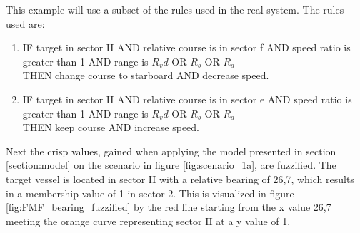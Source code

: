 This example will use a subset of the rules used in the real system.
The rules used are:
\begin{enumerate}[label=\textbf{Rule \arabic*},ref=Rule \arabic*]
    \item \label{rule:1} IF target in sector II AND relative course is in sector f  AND speed ratio is greater than 1  AND range is $R_vd$ OR $R_b$ OR $R_a$ \\THEN change course to starboard  AND  decrease speed.
    \item IF target in sector II AND relative course is in sector e AND  speed ratio is greater than 1  AND  range is $R_vd$ OR $R_b$ OR $R_a$ \\THEN keep course   AND  increase speed.
\end{enumerate}

Next the crisp values, gained when applying the model presented in section \ref{section:model} on the scenario in figure \ref{fig:scenario_1a}, are fuzzified. The target vessel is located in sector II with a relative bearing of 26,7\textdegree, which results in a membership value of 1 in sector 2. This is visualized in figure \ref{fig:FMF_bearing_fuzzified} by the red line starting from the x value 26,7 meeting the orange curve representing sector II at a y value of 1.

